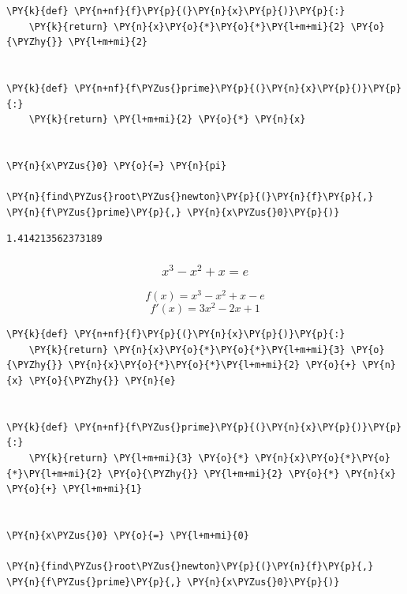     \begin{tcolorbox}[breakable, size=fbox, boxrule=1pt, pad at break*=1mm,colback=cellbackground, colframe=cellborder]
\begin{Verbatim}[commandchars=\\\{\}]
\PY{k}{def} \PY{n+nf}{f}\PY{p}{(}\PY{n}{x}\PY{p}{)}\PY{p}{:}
    \PY{k}{return} \PY{n}{x}\PY{o}{*}\PY{o}{*}\PY{l+m+mi}{2} \PY{o}{\PYZhy{}} \PY{l+m+mi}{2}


\PY{k}{def} \PY{n+nf}{f\PYZus{}prime}\PY{p}{(}\PY{n}{x}\PY{p}{)}\PY{p}{:}
    \PY{k}{return} \PY{l+m+mi}{2} \PY{o}{*} \PY{n}{x}


\PY{n}{x\PYZus{}0} \PY{o}{=} \PY{n}{pi}

\PY{n}{find\PYZus{}root\PYZus{}newton}\PY{p}{(}\PY{n}{f}\PY{p}{,} \PY{n}{f\PYZus{}prime}\PY{p}{,} \PY{n}{x\PYZus{}0}\PY{p}{)}
\end{Verbatim}
\end{tcolorbox}

            \begin{tcolorbox}[breakable, size=fbox, boxrule=.5pt, pad at break*=1mm, opacityfill=0]
\begin{Verbatim}[commandchars=\\\{\}]
1.414213562373189
\end{Verbatim}
\end{tcolorbox}
        
    \hypertarget{x3---x2-x-e}{%
\subsubsection{\texorpdfstring{\[x^3 - x^2 + x = e\]}{x\^{}3 - x\^{}2 + x = e}}\label{x3---x2-x-e}}

\[f(x) = x^3 - x^2 + x - e\] \[f'(x) = 3x^2 - 2x + 1\]

    \begin{tcolorbox}[breakable, size=fbox, boxrule=1pt, pad at break*=1mm,colback=cellbackground, colframe=cellborder]
\begin{Verbatim}[commandchars=\\\{\}]
\PY{k}{def} \PY{n+nf}{f}\PY{p}{(}\PY{n}{x}\PY{p}{)}\PY{p}{:}
    \PY{k}{return} \PY{n}{x}\PY{o}{*}\PY{o}{*}\PY{l+m+mi}{3} \PY{o}{\PYZhy{}} \PY{n}{x}\PY{o}{*}\PY{o}{*}\PY{l+m+mi}{2} \PY{o}{+} \PY{n}{x} \PY{o}{\PYZhy{}} \PY{n}{e}


\PY{k}{def} \PY{n+nf}{f\PYZus{}prime}\PY{p}{(}\PY{n}{x}\PY{p}{)}\PY{p}{:}
    \PY{k}{return} \PY{l+m+mi}{3} \PY{o}{*} \PY{n}{x}\PY{o}{*}\PY{o}{*}\PY{l+m+mi}{2} \PY{o}{\PYZhy{}} \PY{l+m+mi}{2} \PY{o}{*} \PY{n}{x} \PY{o}{+} \PY{l+m+mi}{1}


\PY{n}{x\PYZus{}0} \PY{o}{=} \PY{l+m+mi}{0}

\PY{n}{find\PYZus{}root\PYZus{}newton}\PY{p}{(}\PY{n}{f}\PY{p}{,} \PY{n}{f\PYZus{}prime}\PY{p}{,} \PY{n}{x\PYZus{}0}\PY{p}{)}
\end{Verbatim}
\end{tcolorbox}

